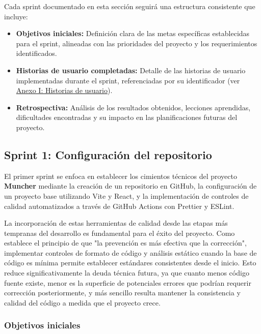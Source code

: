 Cada sprint documentado en esta sección seguirá una estructura consistente que
incluye:

\begin{itemize}
	\item \textbf{Objetivos iniciales:} Definición clara de las metas específicas establecidas para el sprint, alineadas con las prioridades del proyecto y los requerimientos identificados.
	\item \textbf{Historias de usuario completadas:} Detalle de las historias de usuario implementadas durante el sprint, referenciadas por su identificador (ver \hyperref[sec:anexo-historias-usuario]{Anexo I: Historias de usuario}).
	\item \textbf{Retrospectiva:} Análisis de los resultados obtenidos, lecciones aprendidas, dificultades encontradas y su impacto en las planificaciones futuras del proyecto.
\end{itemize}

\subsection*{Sprint 1: Configuración del repositorio}

El primer sprint se enfoca en establecer los cimientos técnicos del proyecto
\textbf{Muncher} mediante la creación de un repositorio en GitHub, la
configuración de un proyecto base utilizando Vite y React, y la implementación
de controles de calidad automatizados a través de GitHub Actions con Prettier y
ESLint.

La incorporación de estas herramientas de calidad desde las etapas más
tempranas del desarrollo es fundamental para el éxito del proyecto. Como
establece el principio de que "la prevención es más efectiva que la
corrección", implementar controles de formato de código y análisis estático
cuando la base de código es mínima permite establecer estándares consistentes
desde el inicio. Esto reduce significativamente la deuda técnica futura, ya que
cuanto menos código fuente existe, menor es la superficie de potenciales
errores que podrían requerir corrección posteriormente, y más sencillo resulta
mantener la consistencia y calidad del código a medida que el proyecto crece.

\subsubsection*{Objetivos iniciales}

